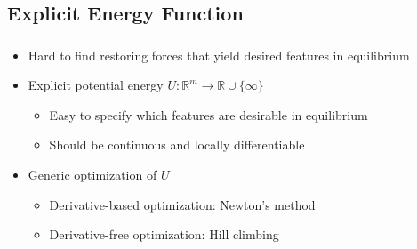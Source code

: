 \subsection{Explicit Energy Function}
\label{subsect:explicit-energy-function}

\begin{frame}
  \frametitle{\insertsubsection}
  \begin{itemize}
    \item Hard to find restoring forces that yield desired features in equilibrium
    \item Explicit potential energy ${U \colon \mathbb{R}^m \to \mathbb{R} \cup \lbrace \infty \rbrace}$ \begin{itemize}
      \item Easy to specify which features are desirable in equilibrium
      \item Should be continuous and locally differentiable
    \end{itemize}
    \item Generic optimization of ${U}$ \begin{itemize}
      \item Derivative-based optimization: \eg{} Newton's method
      \item Derivative-free optimization: \eg{} Hill climbing
    \end{itemize}
  \end{itemize}
\end{frame}
